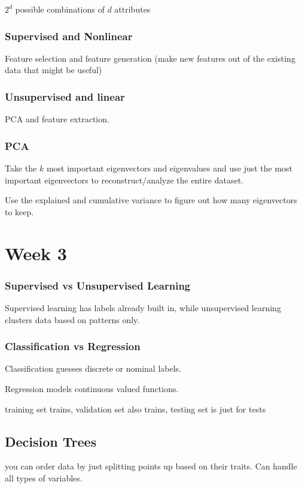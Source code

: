 \documentclass[fleqn]{report}
\begin{document}
$2^d$ possible combinations of $d$ attributes 

\subsection{Supervised and Nonlinear}
Feature selection and feature generation (make new features out of the 
existing data that might be useful)

\subsection{Unsupervised and linear}
PCA and feature extraction. 

\subsection{PCA}
Take the $k$ most important eigenvectors and eigenvalues and use 
just the most important eigenvectors to reconstruct/analyze the entire 
dataset. 

Use the explained and cumulative variance to figure out how many 
eigenvectors to keep. 

\chapter{Week 3}

\subsection{Supervised vs Unsupervised Learning}

Supervised learning has labels already built in, while 
unsupervised learning clusters data based on patterns only.

\subsection{Classification vs Regression}
Classification guesses discrete or nominal labels. 

Regression models continuous valued functions.

training set trains, validation set also trains, testing set is just for tests

\section{Decision Trees}
you can order data by just splitting points up based on their traits. 
Can handle all types of variables. 
\end{document}
